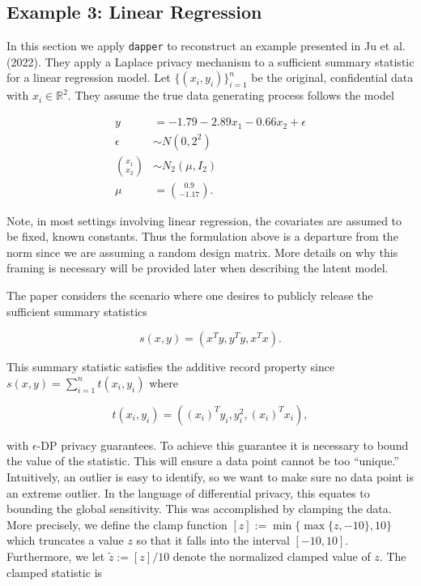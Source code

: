 \hypertarget{example-3-linear-regression}{%
\subsection{Example 3: Linear Regression}\label{example-3-linear-regression}}

In this section we apply \texttt{dapper} to reconstruct an
example presented in Ju et al. (2022). They apply a Laplace privacy
mechanism to a sufficient summary statistic for a linear regression model.
Let \(\{(x_i,y_i)\}_{i=1}^{n}\) be the original, confidential data with \(x_i \in \mathbb{R}^2\).
They assume the true data generating process follows the model

\[
\begin{aligned}
y &= -1.79 -2.89x_1 -0.66x_2 + \epsilon\\
\epsilon &\sim N(0,2^2)\\
\binom{x_1}{x_2} &\sim N_{2}(\mu, I_2)\\
\mu &= \binom{0.9}{-1.17}.
\end{aligned}
\]

Note, in most settings involving linear regression, the covariates are assumed to be
fixed, known constants. Thus the formulation above is a departure from the norm since
we are assuming a random design matrix. More details on why this framing is necessary
will be provided later when describing the latent model.

The paper considers the scenario where one desires to publicly release the
sufficient summary statistics

\[
s(x,y) = (x^Ty, y^Ty, x^Tx).
\]

This summary statistic satisfies the additive record property since \(s(x,y) = \sum_{i=1}^{n} t(x_i, y_i)\)
where

\[
t(x_i,y_i) = ((x_{i})^T y_i, y_i^2, (x_{i})^T x_i),
\]

with \(\epsilon\)-DP privacy guarantees. To achieve this guarantee it is
necessary to bound the value of the statistic. This will ensure
a data point cannot be too ``unique.'' Intuitively, an outlier is
easy to identify, so we want to make sure no data point
is an extreme outlier. In the language of differential
privacy, this equates to bounding the global sensitivity. This was accomplished
by clamping the data. More precisely, we define
the clamp function \([z] := \min\{\max\{z,-10\}, 10\}\) which truncates a value
\(z\) so that it falls into the interval \([-10,10]\). Furthermore, we let \(\tilde{z} := [z]/10\)
denote the normalized clamped value of \(z\). The clamped statistic is

